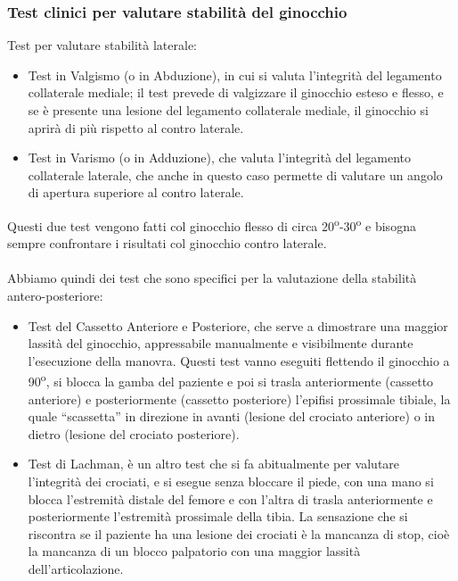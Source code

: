 \subsubsection{Test clinici per valutare stabilità del ginocchio}

Test per valutare stabilità laterale:

\begin{itemize}
\item
  Test in Valgismo (o in Abduzione), in cui si valuta l'integrità del legamento collaterale mediale; il test prevede di valgizzare il ginocchio esteso e flesso, e se è presente una lesione del legamento collaterale mediale, il ginocchio si aprirà di più rispetto al contro laterale.
\item
  Test in Varismo (o in Adduzione), che valuta l'integrità del legamento collaterale laterale, che anche in questo caso permette di valutare un angolo di apertura superiore al contro laterale.
\end{itemize}

Questi due test vengono fatti col ginocchio flesso di circa 20\textsuperscript{o}-30\textsuperscript{o} e
bisogna sempre confrontare i risultati col ginocchio contro laterale.
\\\\
Abbiamo quindi dei test che sono specifici per la valutazione della stabilità antero-posteriore:

\begin{itemize}
\item
  Test del Cassetto Anteriore e Posteriore, che serve a dimostrare una maggior lassità del ginocchio, appressabile manualmente e visibilmente durante l'esecuzione della manovra. Questi test vanno eseguiti flettendo il ginocchio a 90\textsuperscript{o}, si blocca la gamba del paziente e poi si trasla anteriormente (cassetto anteriore) e posteriormente (cassetto posteriore) l'epifisi prossimale tibiale, la quale ``scassetta'' in direzione in avanti (lesione del crociato anteriore) o in dietro (lesione del crociato posteriore).
  
\item
  Test di Lachman, è un altro test che si fa abitualmente per valutare l'integrità dei crociati, e si esegue senza bloccare il piede, con una mano si blocca l'estremità distale del femore e con l'altra di trasla anteriormente e posteriormente l'estremità prossimale della tibia. La sensazione che si riscontra se il paziente ha una lesione dei crociati è la mancanza di stop, cioè la mancanza di un blocco palpatorio con una maggior lassità dell'articolazione.
\end{itemize}

